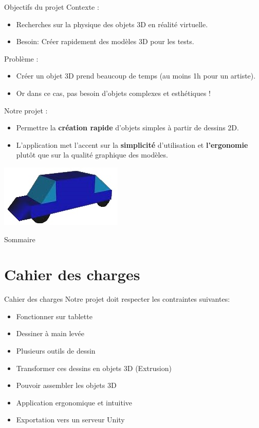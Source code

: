 \documentclass[a4paper,10pt]{beamer}
\begin{document}
	\begin{frame}{Objectifs du projet}
		Contexte :
		\begin{itemize}
			\item Recherches sur la physique des objets 3D en réalité virtuelle.
			\item Besoin: Créer rapidement des modèles 3D pour les tests.\pause
		\end{itemize}
		Problème :
			\begin{itemize}
				\item Créer un objet 3D prend beaucoup de temps (au moins 1h pour un artiste).
				\item Or dans ce cas, pas besoin d'objets complexes et esthétiques !\pause
			\end{itemize}
		Notre projet :
		\begin{itemize}
		\item Permettre la \textbf{création rapide} d'objets simples à partir de dessins 2D.
		\item L'application met l'accent sur la \textbf{simplicité} d'utilisation et \textbf{l'ergonomie} plutôt que sur la qualité graphique des modèles.
		\end{itemize}
			\centerline{\includegraphics[scale=0.3]{images/intro/car.jpg}}
	\end{frame}
	
	\begin{frame}{Sommaire}
		\tableofcontents
	\end{frame}
	
	\section{Cahier des charges}
	
	\begin{frame}{Cahier des charges}
		Notre projet doit respecter les contraintes suivantes:
		\begin{itemize}
			\item Fonctionner sur tablette
			\item Dessiner à main levée
			\item Plusieurs outils de dessin
			\item Transformer ces dessins en objets 3D (Extrusion)
			\item Pouvoir assembler les objets 3D
			\item Application ergonomique et intuitive
			\item Exportation vers un serveur Unity
		\end{itemize}
	\end{frame}
	
\end{document}
